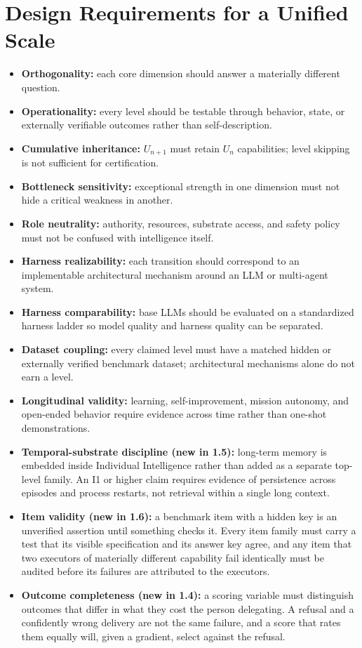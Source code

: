 \documentclass[11pt]{article}
\theoremstyle{definition}
\begin{document}
\section{Design Requirements for a Unified Scale}

\begin{itemize}
\item \textbf{Orthogonality:} each core dimension should answer a materially different question.
\item \textbf{Operationality:} every level should be testable through behavior, state, or externally verifiable outcomes rather than self-description.
\item \textbf{Cumulative inheritance:} $U_{n+1}$ must retain $U_n$ capabilities; level skipping is not sufficient for certification.
\item \textbf{Bottleneck sensitivity:} exceptional strength in one dimension must not hide a critical weakness in another.
\item \textbf{Role neutrality:} authority, resources, substrate access, and safety policy must not be confused with intelligence itself.
\item \textbf{Harness realizability:} each transition should correspond to an implementable architectural mechanism around an LLM or multi-agent system.
\item \textbf{Harness comparability:} base LLMs should be evaluated on a standardized harness ladder so model quality and harness quality can be separated.
\item \textbf{Dataset coupling:} every claimed level must have a matched hidden or externally verified benchmark dataset; architectural mechanisms alone do not earn a level.
\item \textbf{Longitudinal validity:} learning, self-improvement, mission autonomy, and open-ended behavior require evidence across time rather than one-shot demonstrations.
\item \textbf{Temporal-substrate discipline (new in 1.5):} long-term memory is embedded inside Individual Intelligence rather than added as a separate top-level family. An I1 or higher claim requires evidence of persistence across episodes and process restarts, not retrieval within a single long context.
\item \textbf{Item validity (new in 1.6):} a benchmark item with a hidden key is an unverified assertion until something checks it. Every item family must carry a test that its visible specification and its answer key agree, and any item that two executors of materially different capability fail identically must be audited before its failures are attributed to the executors.
\item \textbf{Outcome completeness (new in 1.4):} a scoring variable must distinguish outcomes that differ in what they cost the person delegating. A refusal and a confidently wrong delivery are not the same failure, and a score that rates them equally will, given a gradient, select against the refusal.
\end{itemize}
\end{document}
